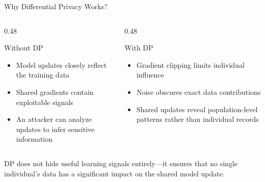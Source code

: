 \documentclass[aspectratio=169]{beamer}
\begin{document}
\begin{frame}{Why Differential Privacy Works?}
    
    \begin{columns}[T]
    
        \begin{column}{0.48\textwidth}
        \begin{block}{Without DP}
        \begin{itemize}
            \item Model updates closely reflect the training data
            \item Shared gradients contain exploitable signals
            \item An attacker can analyze updates to infer sensitive information
        \end{itemize}
        \end{block}
        \end{column}
        
        \begin{column}{0.48\textwidth}
        \begin{block}{With DP}
        \begin{itemize}
            \item Gradient clipping limits individual influence
            \item Noise obscures exact data contributions
            \item Shared updates reveal population-level patterns rather than individual records
        \end{itemize}
        \end{block}
        \end{column}
    
    \end{columns}
    
    \vspace{0.3cm}
    
    \begin{alertblock}{}
        DP does not hide useful learning signals entirely—it ensures that no single individual's data has a significant impact on the shared model update.
    \end{alertblock}

\end{frame}
\end{document}

